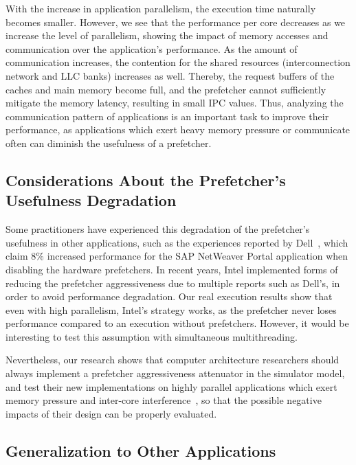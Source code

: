\documentclass[AMA,final,STIX1COL]{WileyNJD-v2}
\begin{document}
With the increase in application parallelism, the execution time naturally becomes smaller. 
However, we see that the performance per core decreases as we increase the level of parallelism, showing the impact of memory accesses and communication over the application's performance.
As the amount of communication increases, the contention for the shared resources (interconnection network and LLC banks) increases as well.
Thereby, the request buffers of the caches and main memory become full, and the prefetcher cannot sufficiently mitigate the memory latency, resulting in small IPC values.
Thus, analyzing the communication pattern of applications is an important task to improve their performance, as applications which exert heavy memory pressure or communicate often can diminish the usefulness of a prefetcher.

\subsection{Considerations About the Prefetcher's Usefulness Degradation}
\label{subsec:pref_usefulness_thoughts}
Some practitioners have experienced this degradation of the prefetcher's usefulness in other applications, such as the experiences reported by Dell~\cite{SAPguide}, which claim 8\% increased performance for the SAP NetWeaver Portal application when disabling the hardware prefetchers.
In recent years, Intel implemented forms of reducing the prefetcher aggressiveness due to multiple reports such as Dell's, in order to avoid performance degradation.
Our real execution results show that even with high parallelism, Intel's strategy works, as the prefetcher never loses performance compared to an execution without prefetchers.
However, it would be interesting to test this assumption with simultaneous multithreading.

Nevertheless, our research shows that computer architecture researchers should always implement a prefetcher aggressiveness attenuator in the simulator model, and test their new implementations on highly parallel applications which exert memory pressure and inter-core interference~\cite{ebrahimi2009coordinated}, so that the possible negative impacts of their design can be properly evaluated.


\subsection{Generalization to Other Applications}
\label{subsec:other_apps}
\end{document}
